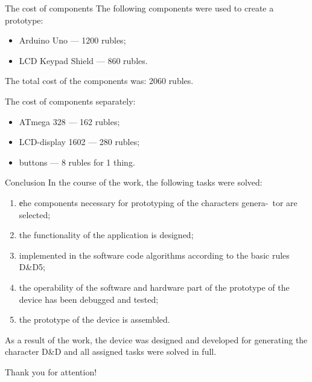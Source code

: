 \documentclass[12pt,a4paper,mathserif]{beamer}
\begin{document}
\begin{frame}{The cost of components}
    \setlength{\parindent}{0.5cm}
    The following components were used to create a prototype:
    \begin{itemize}
        \item Arduino Uno --- 1200 rubles;
        \item LCD Keypad Shield --- 860 rubles.
    \end{itemize}

    The total cost of the components was: 2060 rubles.

     The cost of components separately:

    \begin{itemize}
        \item ATmega 328 --- 162 rubles;
        \item LCD-display 1602 --- 280 rubles;
        \item buttons --- 8 rubles for 1 thing.
    \end{itemize}
\end{frame}

\begin{frame}{Conclusion}
    \setlength{\parindent}{0.5cm}
    In the course of the work, the following tasks were solved:

    \begin{enumerate}
        \item еhe components necessary for prototyping of the characters genera-\ tor are selected;
        
        \item the functionality of the application is designed;
        
        \item implemented in the software code algorithms according to the basic rules D\&D5;
        
        \item the operability of the software and hardware part of the prototype of the device has been debugged and tested;
        
        \item the prototype of the device is assembled.
    \end{enumerate}
    
    As a result of the work, the device was designed and developed for generating the character D\&D and all assigned tasks were solved in full.
\end{frame}

\begin{frame}
    \centering Thank you for attention!
\end{frame}
\end{document}
